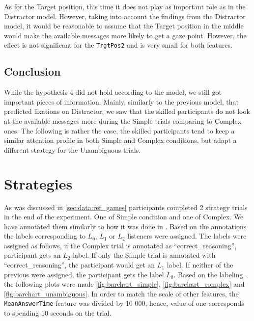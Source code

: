 As for the Target position, this time it does not play as important role as in the Distractor model. However, taking into account the findings from the Distractor model, it would be reasonable to assume that the Target position in the middle would make the available messages more likely to get a gaze point. However, the effect is not significant for the \texttt{TrgtPos2} and is very small for both features. 

\subsection*{Conclusion}
\label{sec:avmsgs_conclusion}
While the hypothesis 4 did not hold according to the model, we still got important pieces of information. Mainly, similarly to the previous model, that predicted fixations on Distractor, we saw that the skilled participants do not look at the available messages more during the Simple trials comparing to Complex ones. The following is rather the case, the skilled participants tend to keep a similar attention profile in both Simple and Complex conditions, but adapt a different strategy for the Unambiguous trials. 









\section{Strategies}

As was discussed in \autoref{sec:data:ref_games} participants completed 2 strategy trials in the end of the experiment. One of Simple condition and one of Complex. We have annotated them similarly to how it was done in \cite{Mayn_2023}. Based on the annotations the labels corresponding to $L_0$, $L_1$ or $L_2$ listeners were assigned. The labels were assigned as follows, if the Complex trial is annotated as ``correct\_reasoning'', participant gets an $L_2$ label. If only the Simple trial is annotated with ``correct\_reasoning'', the participant would get an $L_1$ label. If neither of the previous were assigned, the participant gets the label $L_0$. Based on the labeling, the following plots were made \autoref{fig:barchart_simple}, \autoref{fig:barchart_complex} and \autoref{fig:barchart_unambiguous}. In order to match the scale of other features, the \texttt{MeanAnswerTime} feature was divided by 10 000, hence, value of one corresponds to spending 10 seconds on the trial.

